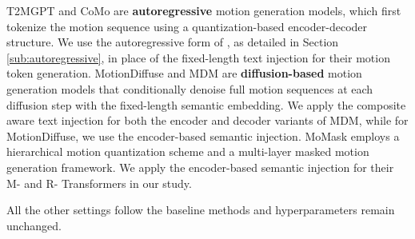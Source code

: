 T2MGPT and CoMo are \textbf{autoregressive} motion generation models, which first tokenize the motion sequence using a quantization-based encoder-decoder structure. 
We use the autoregressive form of {\modulename}, as detailed in Section \ref{sub:autoregressive}, in place of the fixed-length text injection for their motion token generation.
MotionDiffuse and MDM are \textbf{diffusion-based} motion generation models that conditionally denoise full motion sequences at each diffusion step with the fixed-length semantic embedding. 
We apply the composite aware text injection for both the encoder and decoder variants of MDM, while for MotionDiffuse, we use the encoder-based semantic injection. 
MoMask employs a hierarchical motion quantization scheme and a multi-layer masked motion generation framework.  
We apply the encoder-based semantic injection for their M- and R- Transformers in our study.

All the other settings follow the baseline methods and hyperparameters remain unchanged.





